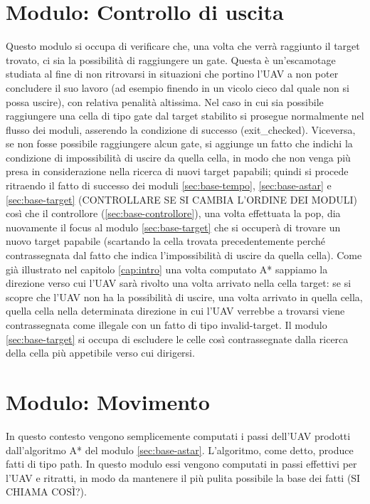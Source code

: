 \section{Modulo: Controllo di uscita} \label{sec:base-uscita}
Questo modulo si occupa di verificare che, una volta che verrà raggiunto il target trovato, ci sia la possibilità di raggiungere un gate. Questa è un'escamotage studiata al fine di non ritrovarsi in situazioni che portino l'UAV a non poter concludere il suo lavoro (ad esempio finendo in un vicolo cieco dal quale non si possa uscire), con relativa penalità altissima.
Nel caso in cui sia possibile raggiungere una cella di tipo gate dal target stabilito si prosegue normalmente nel flusso dei moduli, asserendo la condizione di successo (exit\_checked). Viceversa, se non fosse possibile raggiungere alcun gate, si aggiunge un fatto che indichi la condizione di impossibilità di uscire da quella cella, in modo che non venga più presa in considerazione nella ricerca di nuovi target papabili; quindi si procede ritraendo il fatto di successo dei moduli \ref{sec:base-tempo}, \ref{sec:base-astar} e \ref{sec:base-target} {\color{red}(CONTROLLARE SE SI CAMBIA L'ORDINE DEI MODULI) }così che il controllore (\ref{sec:base-controllore}), una volta effettuata la pop, dia nuovamente il focus al modulo \ref{sec:base-target} che si occuperà di trovare un nuovo target papabile (scartando la cella trovata precedentemente perché contrassegnata dal fatto che indica l'impossibilità di uscire da quella cella). Come già illustrato nel capitolo \ref{cap:intro} una volta computato A* sappiamo la direzione verso cui l'UAV sarà rivolto una volta arrivato nella cella target: se si scopre che l'UAV non ha la possibilità di uscire, una volta arrivato in quella cella, quella cella nella determinata direzione in cui l'UAV verrebbe a trovarsi viene contrassegnata come illegale con un fatto di tipo invalid-target. Il modulo \ref{sec:base-target} si occupa di escludere le celle così contrassegnate dalla ricerca della cella più appetibile verso cui dirigersi.

\section{Modulo: Movimento} \label{sec:base-movimento}
In questo contesto vengono semplicemente computati i passi dell'UAV prodotti dall'algoritmo A* del modulo \ref{sec:base-astar}. L'algoritmo, come detto, produce fatti di tipo path. In questo modulo essi vengono computati in passi effettivi per l'UAV e ritratti, in modo da mantenere il più pulita possibile la {\color{red}base dei fatti (SI CHIAMA COSÌ?)}.
